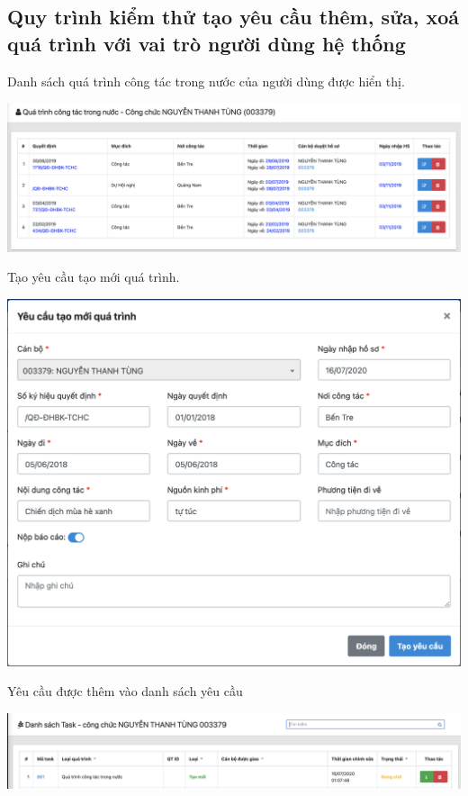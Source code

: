 \subsection{Quy trình kiểm thử tạo yêu cầu thêm, sửa, xoá quá trình với vai trò người dùng hệ thống}
Danh sách quá trình công tác trong nước của người dùng được hiển thị.
\begin{center}
  \captionsetup{type=figure}
  \includegraphics[width=15cm]{img/test/userView.png}
\end{center}
Tạo yêu cầu tạo mới quá trình.
\begin{center}
  \captionsetup{type=figure}
  \includegraphics[width=15cm]{img/test/userForm.png}
\end{center}
Yêu cầu được thêm vào danh sách yêu cầu
\begin{center}
  \captionsetup{type=figure}
  \includegraphics[width=15cm]{img/test/userTask.png}
\end{center}
